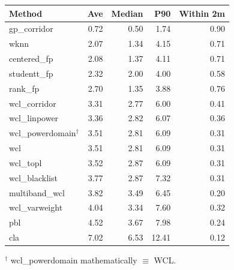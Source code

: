 \begin{tabular}{lrrrr}
\toprule
Method & Ave & Median & P90 & Within 2m \\
\midrule
gp\_corridor & 0.72 & 0.50 & 1.74 & 0.90 \\
wknn & 2.07 & 1.34 & 4.15 & 0.71 \\
centered\_fp & 2.08 & 1.37 & 4.11 & 0.71 \\
studentt\_fp & 2.32 & 2.00 & 4.00 & 0.58 \\
rank\_fp & 2.70 & 1.35 & 3.88 & 0.76 \\
wcl\_corridor & 3.31 & 2.77 & 6.00 & 0.41 \\
wcl\_linpower & 3.36 & 2.82 & 6.07 & 0.36 \\
wcl\_powerdomain$^\dagger$ & 3.51 & 2.81 & 6.09 & 0.31 \\
wcl & 3.51 & 2.81 & 6.09 & 0.31 \\
wcl\_topl & 3.52 & 2.87 & 6.09 & 0.31 \\
wcl\_blacklist & 3.77 & 2.87 & 7.32 & 0.31 \\
multiband\_wcl & 3.82 & 3.49 & 6.45 & 0.20 \\
wcl\_varweight & 4.04 & 3.34 & 7.60 & 0.32 \\
pbl & 4.52 & 3.67 & 7.98 & 0.24 \\
cla & 7.02 & 6.53 & 12.41 & 0.12 \\
\bottomrule
\end{tabular}
\par\footnotesize $^\dagger$ wcl\_powerdomain mathematically $\equiv$ WCL.
